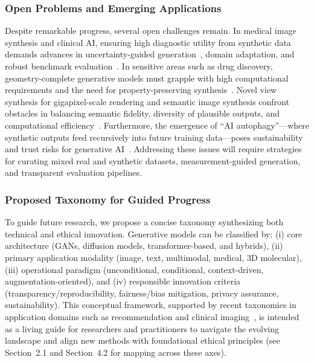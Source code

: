 \documentclass[sigconf]{acmart}
\begin{document}
\subsubsection{Open Problems and Emerging Applications}
Despite remarkable progress, several open challenges remain. In medical image synthesis and clinical AI, ensuring high diagnostic utility from synthetic data demands advances in uncertainty-guided generation~\cite{ref91}, domain adaptation, and robust benchmark evaluation~\cite{ref81,ref102}. In sensitive areas such as drug discovery, geometry-complete generative models must grapple with high computational requirements and the need for property-preserving synthesis~\cite{ref74}. Novel view synthesis for gigapixel-scale rendering and semantic image synthesis confront obstacles in balancing semantic fidelity, diversity of plausible outputs, and computational efficiency~\cite{ref90,ref92,ref93}. Furthermore, the emergence of “AI autophagy”---where synthetic outputs feed recursively into future training data---poses sustainability and trust risks for generative AI~\cite{ref82}. Addressing these issues will require strategies for curating mixed real and synthetic datasets, measurement-guided generation, and transparent evaluation pipelines.

\subsubsection{Proposed Taxonomy for Guided Progress}
To guide future research, we propose a concise taxonomy synthesizing both technical and ethical innovation. Generative models can be classified by: (i) core architecture (GANs, diffusion models, transformer-based, and hybrids), (ii) primary application modality (image, text, multimodal, medical, 3D molecular), (iii) operational paradigm (unconditional, conditional, context-driven, augmentation-oriented), and (iv) responsible innovation criteria (transparency/reproducibility, fairness/bias mitigation, privacy assurance, sustainability). This conceptual framework, supported by recent taxonomies in application domains such as recommendation and clinical imaging~\cite{ref75,ref81,ref91}, is intended as a living guide for researchers and practitioners to navigate the evolving landscape and align new methods with foundational ethical principles (see Section~2.1 and Section~4.2 for mapping across these axes).
\end{document}

